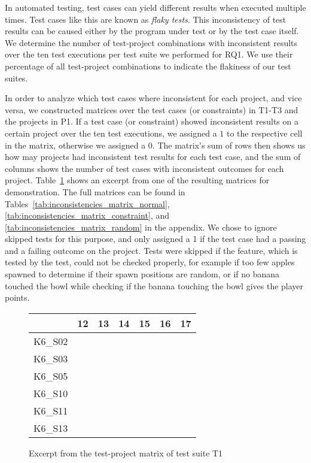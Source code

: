 \noindent In automated testing, test cases can yield different results when executed multiple times.
Test cases like this are known as \textit{flaky tests}.
This inconsistency of test results can be caused either by the program under test or by the test case itself.
We determine the number of test-project combinations with inconsistent results over the ten test executions per test suite we performed for RQ1.
We use their percentage of all test-project combinations to indicate the flakiness of our test suites.
\parspace

In order to analyze which test cases where inconsistent for each project, and vice versa,
we constructed matrices over the test cases (or constraints) in T1-T3 and the projects in P1.
If a test case (or constraint) showed inconsistent results on a certain project over the ten test executions,
we assigned a $1$ to the respective cell in the matrix, otherwise we assigned a 0.
The matrix's sum of rows then shows us how may projects had inconsistent test results for each test case,
and the sum of columns shows the number of test cases with inconsistent outcomes for each project.
Table~\ref{tab:inconsistency_matrices_excerpt} shows an excerpt from one of the resulting matrices for demonstration.
The full matrices can be found in Tables~\ref{tab:inconsistencies_matrix_normal}, \ref{tab:inconsistencies_matrix_constraint}, and \ref{tab:inconsistencies_matrix_random} in the appendix.
We chose to ignore skipped tests for this purpose,
and only assigned a 1 if the test case had a passing and a failing outcome on the project.
Tests were skipped if the feature, which is tested by the test, could not be checked properly,
for example if too few apples spawned to determine if their spawn positions are random,
or if no banana touched the bowl while checking if the banana touching the bowl gives the player points.
\parspace

\begin{figure}[htpb]
    \centering

    \setlength{\tabcolsep}{0.2em}
    \tiny
    \begin{tabular}{l|rrrrrr}
        \toprule
                & 12 & 13 & 14 & 15 & 16 & 17 \\
        \midrule
        K6\_S02 & \y & \x & \y & \y & \y & \y \\
        K6\_S03 & \y & \x & \y & \y & \y & \y \\
        K6\_S05 & \y & \y & \y & \y & \y & \y \\
        K6\_S10 & \y & \x & \x & \y & \y & \y \\
        K6\_S11 & \y & \y & \y & \y & \y & \y \\
        K6\_S13 & \y & \y & \y & \y & \y & \y \\
        \bottomrule
    \end{tabular}
    \setlength{\tabcolsep}{\defaulttabcolsep}

    \caption{Excerpt from the test-project matrix of test suite T1}
    \label{tab:inconsistency_matrices_excerpt}
\end{figure}

